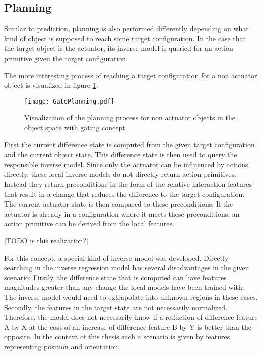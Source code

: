 
\subsection{Planning}

Similar to prediction, planning is also performed differently depending on what kind of object is supposed to reach some target configuration. In the case that the target object is the actuator, its inverse model is queried for an action primitive given the target configuration. 

The more interesting process of reaching a target configuration for a non actuator object is visualized in figure \ref{fig:GatePlanning}.

\begin{figure}
	\centering
	\texttt{[image: GatePlanning.pdf]}
	\caption{Visualization of the planning process for non actuator objects in the object space with gating concept. } 
	\label{fig:GatePlanning}
\end{figure}

First the current difference state is computed from the given target configuration and the current object state. This difference state is then used to query the responsible inverse model. Since only the actuator can be influenced by actions directly, these local inverse models do not directly return action primitives. Instead they return preconditions in the form of the relative interaction features that result in a change that reduces the difference to the target configuration. The current actuator state is then compared to these preconditions. If the actuator is already in a configuration where it meets these preconditions, an action primitive can be derived from the local features.

[TODO is this realization?]

For this concept, a special kind of inverse model was developed. Directly searching in the inverse regression model has several disadvantages in the given scenario: Firstly, the difference state that is computed can have features magnitudes greater than any change the local models have been trained with. The inverse model would need to extrapolate into unknown regions in these cases. Secondly, the features in the target state are not necessarily normalized. Therefore, the model does not necessarily know if a reduction of difference feature A by X at the cost of an increase of difference feature B by Y is better than the opposite. In the context of this thesis such a scenario is given by features representing position and orientation. 

